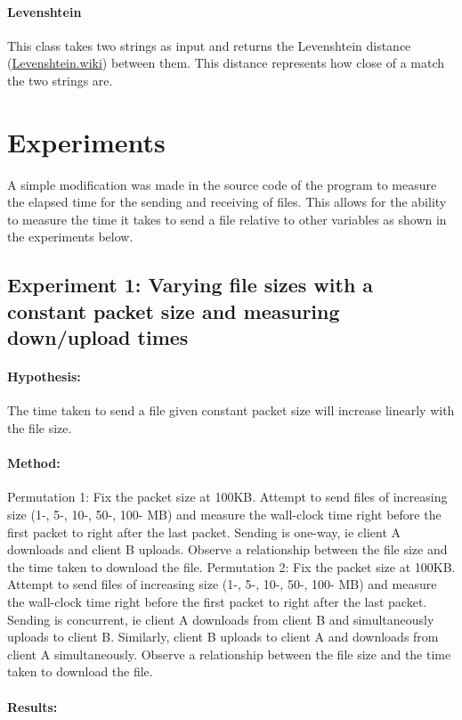 \documentclass[12pt, a4paper]{article}
\begin{document}
\paragraph{Levenshtein}
This class takes two strings as input and returns the Levenshtein distance (\href{https://en.wikipedia.org/wiki/Levenshtein_distance}{Levenshtein.wiki}) between them. This distance represents how close of a match the two strings are.

\section{Experiments}
A simple modification was made in the source code of the program to measure the elapsed time for the sending and receiving of files. This allows for the ability to measure the time it takes to send a file relative to other variables as shown in the experiments below.

\subsection{Experiment 1: Varying file sizes with a constant packet size and measuring down/upload times}
\paragraph{Hypothesis:}
The time taken to send a file given constant packet size will increase linearly with the file size.
\paragraph{Method:}
Permutation 1: Fix the packet size at 100KB. Attempt to send files of increasing size (1-, 5-, 10-, 50-, 100- MB) and measure the wall-clock time right before the first packet to right after the last packet. Sending is one-way, ie client A downloads and client B uploads. Observe a relationship between the file size and the time taken to download the file. 
Permutation 2: Fix the packet size at 100KB. Attempt to send files of increasing size (1-, 5-, 10-, 50-, 100- MB) and measure the wall-clock time right before the first packet to right after the last packet. Sending is concurrent, ie client A downloads from client B and simultaneously uploads to client B. Similarly, client B uploads to client A and downloads from client A simultaneously. Observe a relationship between the file size and the time taken to download the file.
\paragraph{Results:} 
\end{document}
